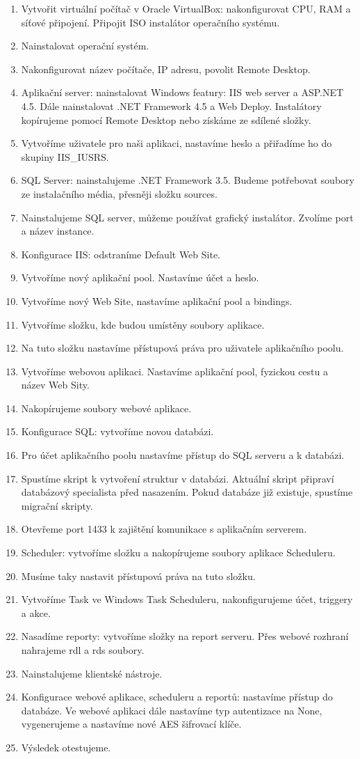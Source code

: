 \begin{enumerate}
\item Vytvořit virtuální počítač v Oracle VirtualBox: nakonfigurovat CPU, RAM a síťové připojení. Připojit ISO instalátor operačního systému.
\item Nainstalovat operační systém.
\item Nakonfigurovat název počítače, IP adresu, povolit Remote Desktop.
\item Aplikační server: nainstalovat Windows featury: IIS web server a ASP.NET 4.5. Dále nainstalovat .NET Framework 4.5 a Web Deploy. Instalátory kopírujeme pomocí Remote Desktop nebo získáme ze sdílené složky.
\item Vytvoříme uživatele pro naši aplikaci, nastavíme heslo a přiřadíme ho do skupiny IIS\_IUSRS.
\item SQL Server: nainstalujeme .NET Framework 3.5. Budeme potřebovat soubory ze instalačního média, přesněji složku sources.
\item Nainstalujeme SQL server, můžeme používat grafický instalátor. Zvolíme port a název instance.
\item Konfigurace IIS: odstraníme Default Web Site.
\item Vytvoříme nový aplikační pool. Nastavíme účet a heslo.
\item Vytvoříme nový Web Site, nastavíme aplikační pool a bindings. 
\item Vytvoříme složku, kde budou umístěny soubory aplikace.
\item Na tuto složku nastavíme přístupová práva pro uživatele aplikačního poolu.
\item Vytvoříme webovou aplikaci. Nastavíme aplikační pool, fyzickou cestu a název Web Sity. 
\item Nakopírujeme soubory webové aplikace. 
\item Konfigurace SQL: vytvoříme novou databázi. 
\item Pro účet aplikačního poolu nastavíme přístup do SQL serveru a k databázi.
\item Spustíme skript k vytvoření struktur v databázi. Aktuální skript připraví databázový specialista před nasazením. Pokud databáze již existuje, spustíme migrační skripty.
\item Otevřeme port 1433 k zajištění komunikace s aplikačním serverem.
\item Scheduler: vytvoříme složku a nakopírujeme soubory aplikace Scheduleru.
\item Musíme taky nastavit přístupová práva na tuto složku.
\item Vytvoříme Task ve Windows Task Scheduleru, nakonfigurujeme účet, triggery a akce.
\item Nasadíme reporty: vytvoříme složky na report serveru. Přes webové rozhraní nahrajeme rdl a rds soubory.
\item Nainstalujeme klientské nástroje.
\item Konfigurace webové aplikace, scheduleru a reportů: nastavíme přístup do databáze. Ve webové aplikaci dále nastavíme typ autentizace na None, vygenerujeme a nastavíme nové AES šifrovací klíče. 
\item Výsledek otestujeme.
\end{enumerate}

